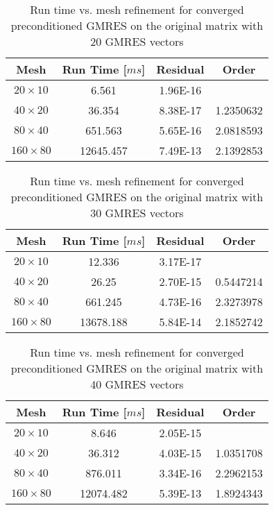 \documentclass{article}
\begin{document}
\begin{table}[H]
\centering
\caption{Run time vs. mesh refinement for converged preconditioned  GMRES on the original matrix with 20 GMRES vectors}
\label{table_GMRES_pre_4}
\begin{tabular}{cccc}
\hline
Mesh & Run Time [$m s$] & Residual & Order\\
\hline\hline
$20 \times 10$  & 6.561     & 1.96E-16 &           \\
$40 \times 20$  & 36.354    & 8.38E-17 & 1.2350632 \\
$80 \times 40$  & 651.563   & 5.65E-16 & 2.0818593 \\
$160 \times 80$ & 12645.457 & 7.49E-13 & 2.1392853 \\
\hline
\end{tabular}
\end{table}

\begin{table}[H]
\centering
\caption{Run time vs. mesh refinement for  converged preconditioned  GMRES  on the original matrix with 30 GMRES vectors}
\label{table_GMRES_pre_5}
\begin{tabular}{cccc}
\hline
Mesh & Run Time [$m s$] & Residual & Order\\
\hline\hline
$20 \times 10$  & 12.336    & 3.17E-17 &           \\
$40 \times 20$  & 26.25     & 2.70E-15 & 0.5447214 \\
$80 \times 40$  & 661.245   & 4.73E-16 & 2.3273978 \\
$160 \times 80$ & 13678.188 & 5.84E-14 & 2.1852742 \\
\hline
\end{tabular}
\end{table}

\begin{table}[H]
\centering
\caption{Run time vs. mesh refinement for  converged  preconditioned GMRES  on the original matrix with 40 GMRES vectors}
\label{table_GMRES_pre_6}
\begin{tabular}{cccc}
\hline
Mesh & Run Time [$m s$] & Residual & Order\\
\hline\hline
$20 \times 10$  & 8.646     & 2.05E-15 &           \\
$40 \times 20$  & 36.312    & 4.03E-15 & 1.0351708 \\
$80 \times 40$  & 876.011   & 3.34E-16 & 2.2962153 \\
$160 \times 80$ & 12074.482 & 5.39E-13 & 1.8924343 \\
\hline
\end{tabular}
\end{table}
\end{document}
